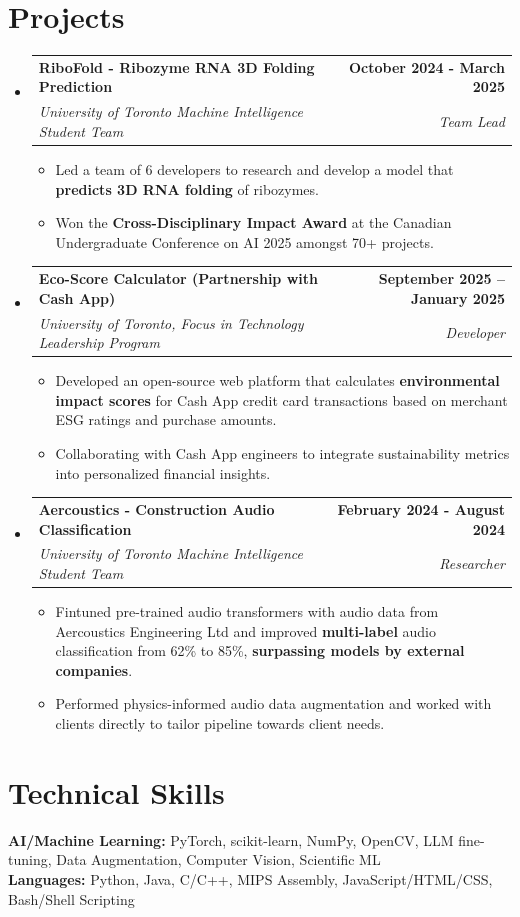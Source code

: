 \documentclass[letterpaper,11pt]{article}
\makeatletter
\newcommand{\resumeItem}[1]{
  \item\small{
    {#1 \vspace{-2pt}}
  }
}
\newcommand{\resumeSubheading}[4]{
  \vspace{6pt}\item   
    \begin{tabular*}{1.0\textwidth}[t]{l@{\extracolsep{\fill}}r}
      \textbf{#1} & \textbf{\small #2} \\
      \textit{\small#3} & \textit{\small #4} \\
    \end{tabular*}\vspace{-3pt}
}
\newcommand{\resumeSubHeadingListStart}{\begin{itemize}[leftmargin=0.0in, label={}]}
\newcommand{\resumeSubHeadingListEnd}{\end{itemize}}
\newcommand{\resumeItemListStart}{\begin{itemize}}
\newcommand{\resumeItemListEnd}{\end{itemize}\vspace{-5pt}}
\makeatother
\begin{document}
\section{Projects}
  \resumeSubHeadingListStart
  
    \resumeSubheading
      {RiboFold - Ribozyme RNA 3D Folding Prediction}{October 2024 - March 2025}
      {University of Toronto Machine Intelligence Student Team}{Team Lead}
      \resumeItemListStart
        \resumeItem{Led a team of 6 developers to research and develop a model that \textbf{predicts 3D RNA folding} of ribozymes.}
        \resumeItem{ Won the \textbf{Cross-Disciplinary Impact Award} at the Canadian Undergraduate Conference on AI 2025 amongst 70+ projects.}
    \resumeItemListEnd

\resumeSubheading
  {Eco-Score Calculator (Partnership with Cash App)}{September 2025 – January 2025}
  {University of Toronto, Focus in Technology Leadership Program}{Developer}
\resumeItemListStart
    \resumeItem{Developed an open-source web platform that calculates \textbf{environmental impact scores} for Cash App credit card transactions based on merchant ESG ratings and purchase amounts.}
    \resumeItem{Collaborating with Cash App engineers to integrate sustainability metrics into personalized financial insights.}
\resumeItemListEnd

    
    \resumeSubheading
      {Aercoustics - Construction Audio Classification}{February 2024 - August 2024}
      {University of Toronto Machine Intelligence Student Team}{Researcher}
      \resumeItemListStart
        \resumeItem{Fintuned pre-trained audio transformers} with audio data from Aercoustics Engineering Ltd and improved \textbf{multi-label} audio classification from 62\% to 85\%, \textbf{surpassing models by external companies}.
        \resumeItem{Performed physics-informed audio data augmentation and worked with clients directly to tailor pipeline towards client needs.}
          \resumeItemListEnd
\resumeSubHeadingListEnd


\section{Technical Skills}

\textbf{AI/Machine Learning:} PyTorch, scikit-learn, NumPy, OpenCV, LLM fine-tuning, Data Augmentation, Computer Vision, Scientific ML \\[0.5em]

\textbf{Languages:} Python, Java, C/C++, MIPS Assembly, JavaScript/HTML/CSS, Bash/Shell Scripting\\[0.5em]
\end{document}
